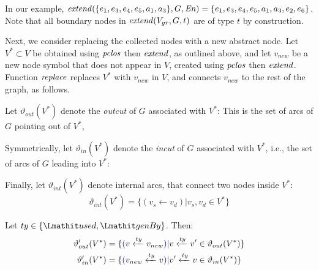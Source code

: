 
%
In our example, $\mathit{extend}(\{e_1, e_3, e_4, e_5, a_1, a_3\}, G, \mathit{En}) = \{e_1, e_3, e_4, e_5, a_1, a_3, e_2, e_6\}$.  Note that all boundary nodes in $\mathit{extend}(V_{gr}, G, t)$ are of type $t$ by construction.

Next, we consider replacing the collected nodes with a new abstract node.
%
Let $V^* \subset V$ be obtained using $\mathit{pclos}$ then $\mathit{extend}$, as outlined above, and let $v_{new}$ be a new node symbol that does not appear in $V$, created using $\mathit{pclos}$ then $\mathit{extend}$. 
Function $\mathit{replace}$ replaces $V^*$ with $v_{new}$ in $V$, and connects $v_{new}$ to the rest of the graph, as follows.

Let $\vartheta_{out}(V^*)$ denote the \textit{outcut} of $G$ associated with $V^*$:
\jwb{\[ \vartheta_{out}(V^*) = \{  (v_d \leftarrow v_s) |   v_s \in  V^*, v_d \in V \setminus V^*\}\]}
This is the set of arcs of $G$ pointing out of $V^*$,

Symmetrically, let $\vartheta_{in}(V^*)$ denote the \textit{incut}  of $G$ associated with $V^*$, i.e., the set of arcs of $G$ leading into $V^*$:
\jwb{\[ \vartheta_{in}(V^*) = \{  (v_d\leftarrow v_s) |  v_d \in V^*, v_s \in  V \setminus V^* \}\]}

Finally, let $\vartheta_{int}(V^*)$ denote internal arcs, that connect two nodes inside $V^*$:
\[ \vartheta_{int}(V^*) = \{  (v_s\leftarrow v_d) | v_s, v_d \in V^*\}\]


%


%

\begin{definition}
  Let $ty \in \{\used,  \wgby\}$. Then:
  \begin{align*}
\vartheta_{out}'(V^*) = \{ & \jwb{(}v \xleftarrow{ty}  v_{new} \jwb{)}|  v \xleftarrow{ty} v' \in \vartheta_{out}(V^*)  \}  \\
\vartheta_{in}'(V^*) = \{ & \jwb{(}v_{new} \xleftarrow{ty} v \jwb{)} | v' \xleftarrow{ty} v \in \vartheta_{in}(V^*)  \}   
\end{align*}
\label{def:eq:outcut}
\end{definition}

